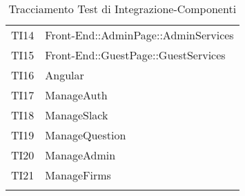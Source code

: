 \documentclass[../PianoDiQualifica_v3.0.0.tex]{subfiles}
\begin{document}
\begin{longtable}[c] { >{\centering\arraybackslash}p{2cm} >{\centering\arraybackslash}p{11cm}}
			\addlinespace[0.3em]
			\midrule
			\addlinespace[0.3em]
			TI14 & Front-End::AdminPage::AdminServices \\
			\addlinespace[0.3em]
			\midrule
			\addlinespace[0.3em]
			TI15 & Front-End::GuestPage::GuestServices \\
			\addlinespace[0.3em]
			\midrule
			\addlinespace[0.3em]
			TI16 & Angular \\
			\addlinespace[0.3em]
			\midrule
			\addlinespace[0.3em]
			TI17 & ManageAuth \\
			\addlinespace[0.3em]
			\midrule
			\addlinespace[0.3em]
			TI18 & ManageSlack \\
			\addlinespace[0.3em]
			\midrule
			\addlinespace[0.3em]
			TI19 & ManageQuestion \\
			\addlinespace[0.3em]
			\midrule
			\addlinespace[0.3em]
			TI20 & ManageAdmin \\
			\addlinespace[0.3em]
			\midrule
			\addlinespace[0.3em]
			TI21 & ManageFirms \\
			\bottomrule
			\caption{Tracciamento Test di Integrazione-Componenti}
	\end{longtable}

	\newpage
\end{document}
